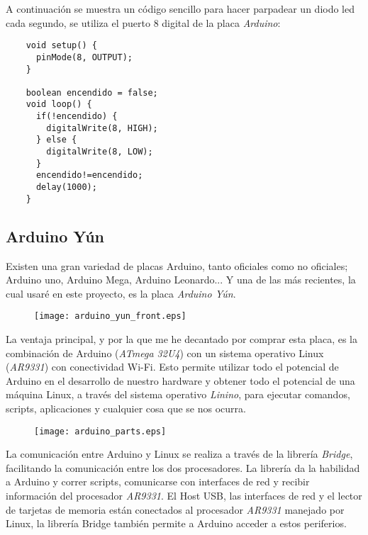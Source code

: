 A continuación se muestra un código sencillo para hacer parpadear un diodo led cada segundo, se utiliza el puerto 8 digital de la placa \emph{Arduino}:

\begin{lstlisting}
    void setup() {
      pinMode(8, OUTPUT);
    }

    boolean encendido = false;
    void loop() {
      if(!encendido) {
        digitalWrite(8, HIGH);
      } else {
        digitalWrite(8, LOW);
      }
      encendido!=encendido;
      delay(1000);
    }
\end{lstlisting}

\subsection{Arduino Yún}

Existen una gran variedad de placas Arduino, tanto oficiales como no oficiales; Arduino uno, Arduino Mega, Arduino Leonardo... Y una de las más recientes, la cual usaré en este proyecto, es la placa \emph{Arduino Yún}.

\begin{figure}[h!]
    \centering
    \texttt{[image: arduino\_yun\_front.eps]}
    \label{fig:arduino-ide}
\end{figure}

La ventaja principal, y por la que me he decantado por comprar esta placa, es la combinación de Arduino (\emph{ATmega 32U4}) con un sistema operativo Linux (\emph{AR9331}) con conectividad Wi-Fi. Esto permite utilizar todo el potencial de Arduino en el desarrollo de nuestro hardware y obtener todo el potencial de una máquina Linux, a través del sistema operativo \emph{Linino}, para ejecutar comandos, scripts, aplicaciones y cualquier cosa que se nos ocurra.

\begin{figure}[h!]
    \centering
    \texttt{[image: arduino\_parts.eps]}
    \label{fig:arduino-ide}
\end{figure}

La comunicación entre Arduino y Linux se realiza a través de la librería \emph{Bridge}, facilitando la comunicación entre los dos procesadores. La librería da la habilidad a Arduino y correr scripts, comunicarse con interfaces de red y recibir información del procesador \emph{AR9331}. El Host USB, las interfaces de red y el lector de tarjetas de memoria están conectados al procesador \emph{AR9331} manejado por Linux, la librería Bridge también permite a Arduino acceder a estos periferios.

